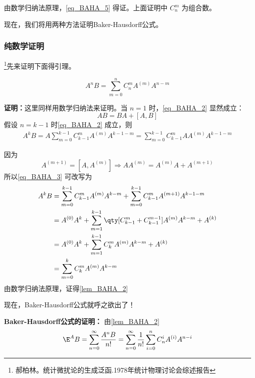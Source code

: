 由数学归纳法原理，\autoref{eq_BAHA_5} 得证。上面证明中 $C_n^m$ 为组合数。

现在，我们将用两种方法证明Baker-Hausdorff公式。
\subsubsection{纯数学证明}
\footnote{郝柏林。统计微扰论的生成泛函.1978年统计物理讨论会综述报告}先来证明下面得引理。
\begin{lemma}{}\label{lem_BAHA_2}
\begin{equation}\label{eq_BAHA_2}
A^nB=\sum_{m=0}^{n}C_{n}^mA^{(m)}A^{n-m}
\end{equation}
\end{lemma}
\textbf{证明：}这里同样用数学归纳法来证明。当 $n=1$ 时，\autoref{eq_BAHA_2} 显然成立：
\begin{equation}
AB=BA+[A,B]
\end{equation}
假设 $n=k-1$ 时\autoref{eq_BAHA_2} 成立，则
\begin{equation}\label{eq_BAHA_3}
\begin{aligned}
A^{k}B=A\sum_{m=0}^{k-1}C_{k-1}^mA^{(m)}A^{k-1-m}=\sum_{m=0}^{k-1}C_{k-1}^mAA^{(m)}A^{k-1-m}
\end{aligned}
\end{equation}

因为
\begin{equation}
A^{(m+1)}=[A,A^{(m)}]\Rightarrow AA^{(m)}=A^{(m)}A+A^{(m+1)}
\end{equation}
所以\autoref{eq_BAHA_3} 可改写为
\begin{equation}
\begin{aligned}
A^k B&=\sum_{m=0}^{k-1}C_{k-1}^mA^{(m)}A^{k-m}+\sum_{m=0}^{k-1}C_{k-1}^mA^{(m+1)}A^{k-1-m}\\
&=A^{(0)}A^{k}+\sum_{m=1}^{k-1}\qty[C_{k-1}^m+C_{k-1}^{m-1}]A^{(m)}A^{k-m}+A^{(k)}\\
&=A^{(0)}A^{k}+\sum_{m=1}^{k-1}C_{k}^mA^{(m)}A^{k-m}+A^{(k)}\\
&=\sum_{m=0}^{k}C_{k}^mA^{(m)}A^{k-m}
\end{aligned}
\end{equation}
由数学归纳法原理，证得\autoref{lem_BAHA_2} 

现在，Baker-Hausdorff公式就呼之欲出了！

\textbf{Baker-Hausdorff公式的证明：}
由\autoref{lem_BAHA_2} 
\begin{equation}\label{eq_BAHA_4}
\E^A B=\sum_{n=0}^{\infty}\frac{A^nB}{n!}=\sum_{n=0}^{\infty}\frac{1}{n!}\sum_{i=0}^{n}C_{n}^iA^{(i)}A^{n-i}
\end{equation}


